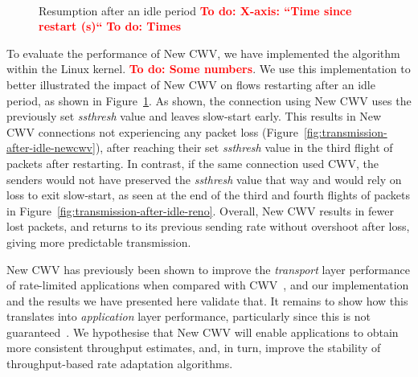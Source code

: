 \documentclass[10pt,sigconf,anonymous]{acmart}
\newcommand{\todo}[1]{\textbf{\textcolor{red}{To do: #1}}}
\begin{document}
\begin{figure}[t!]
  \centering
  \\
    \caption{Resumption after an idle period \todo{X-axis: ``Time since restart (s)``} \todo{Times}}
    \label{fig:transmission-after-idle}
\end{figure}

To evaluate the performance of New CWV, we have implemented the algorithm within the Linux kernel. \todo{Some numbers}. We use this implementation to better illustrated the impact of New CWV on flows restarting after an idle period, as shown in Figure~\ref{fig:transmission-after-idle}.
As shown, the connection using New CWV uses the previously set \emph{ssthresh} value and leaves slow-start early. This results in New CWV connections not experiencing any packet loss (Figure~\ref{fig:transmission-after-idle-newcwv}), after reaching their set \emph{ssthresh} value in the third flight of packets after restarting. In contrast, if the same connection used CWV, the senders would not have preserved the \emph{ssthresh} value that way and would rely on loss to exit slow-start, as seen at the end of the third and fourth flights of packets in Figure~\ref{fig:transmission-after-idle-reno}. Overall, New CWV results in fewer lost packets, and returns to its previous sending rate without overshoot after loss, giving more predictable transmission.

New CWV has previously been shown to improve the \emph{transport} layer performance of rate-limited applications when compared with CWV~\cite{Nazir-2014-performance-evaluation-congestion-window-validation-dash-newcwv}, and our implementation and the results we have presented here validate that. It remains to show how this translates into \emph{application} layer performance, particularly since this is not guaranteed~\cite{Spiteri-2016-BOLA}. We hypothesise that New CWV will enable applications to obtain more consistent throughput estimates, and, in turn, improve the stability of throughput-based rate adaptation algorithms.
\end{document}
